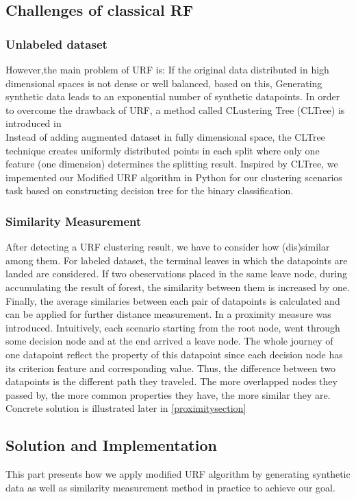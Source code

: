 \documentclass[conference]{IEEEtran}
\begin{document}
\subsection{Challenges of classical RF}
\subsubsection{Unlabeled dataset}\label{challenge1}
However,the main problem of URF is: If the original data distributed in high dimensional spaces is not dense or well balanced, based on this, Generating synthetic data leads to an exponential number of synthetic datapoints.\cite{kruber2018unsupervised}
In order to overcome the drawback of URF, a method called CLustering Tree (CLTree) is introduced in \cite{liu2000clustering}
\\Instead of adding augmented dataset in fully dimensional space, the CLTree technique creates uniformly distributed points in each split where only one feature (one dimension) determines the splitting result.
Inspired by CLTree, we impemented our Modified URF algorithm in Python for our clustering scenarios task based on constructing decision tree for the binary classification.
\subsubsection{Similarity Measurement}
After detecting a URF clustering result, we have to consider how (dis)similar among them. For labeled dataset, the terminal leaves in which the datapoints are landed are considered. If two obeservations placed in the same leave node, during accumulating the result of forest, the similarity between them is increased by one. 
Finally, the average similaries between each pair of datapoints is calculated and can be applied for further distance measurement. 
In \cite{Kruber2019UnsupervisedAS} a proximity measure was introduced. Intuitively, each scenario starting from the root node, went through some decision node and at the end arrived a leave node. 
The whole journey of one datapoint reflect the property of this datapoint since each decision node has its criterion feature and corresponding value. Thus, the difference between two datapoints is the different path they traveled.
The more overlapped nodes they passed by, the more common properties they have, the more similar they are. Concrete solution is illustrated later in \autoref{proximitysection}
\subsection{Solution and Implementation}
This part presents how we apply modified URF algorithm by generating synthetic data as well as similarity measurement method in practice to achieve our goal. 
\end{document}
